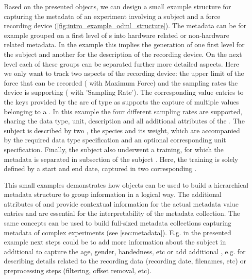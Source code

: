 Based on the presented  objects, we can design a small example structure for capturing the metadata of an experiment involving a subject and a force recording device (\cref{fig:intro_example_odml_structure}). The metadata can be for example grouped on a first level of s into hardware related or non-hardware related metadata. In the example this implies the generation of one first level  for the subject and another  for the description of the recording device. On the next level each of these groups can be separated further more detailed aspects. Here we only want to track two aspects of the recording device: the upper limit of the force that can be recorded ( with  Maximum Force) and the sampling rates the device is supporting ( with  'Sampling Rate'). The corresponding value entries to the keys provided by the  are of type  as  supports the capture of multiple values belonging to a . In this example the four different sampling rates are supported, sharing the data type, unit, description and all additional attributes of the . The subject is described by two , the species and its weight, which are accompanied by the required data type specification and an optional corresponding unit specification. Finally, the subject also underwent a training, for which the metadata is separated in subsection of the subject . Here, the training is solely defined by a start and end date, captured in two corresponding .

This small examples demonstrates how  objects can be used to build a hierarchical metadata structure to group information in a logical way. The additional attributes of  and  provide contextual information for the actual metadata value entries and are essential for the interpretability of the metadata collection. The same concepts can be used to build full-sized metadata collections capturing metadata of complex experiments (see \ref{sec:metadata}). E.g. in the presented example next steps could be to add more information about the subject in additional  to capture the age, gender, handedness, etc or add additional , e.g. for describing details related to the recording data (recording date, filenames, etc) or preprocessing steps (filtering, offset removal, etc).

